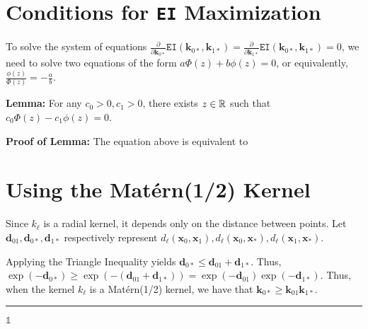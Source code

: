 \documentclass[11pt]{article}
\def\EI{\texttt{EI}}
\newcommand{\bs}[1]{\boldsymbol{#1}}
\def\bsx{\bs{x}}
\def\bsk{\bs{k}}
\def\bsd{\bs{d}}
\def\bell{\bs{\ell}}
\def\xast{\bsx_{*}}
\def\Matern{\textrm{Mat\'{e}rn}}
\begin{document}
\newpage 

\section{Conditions for \EI{} Maximization}

To solve the system of equations $\frac{\partial}{\partial \bsk_{0*}}\EI(\bsk_{0*}, \bsk_{1*}) = \frac{\partial}{\partial \bsk_{1*}}\EI(\bsk_{0*}, \bsk_{1*}) = 0$, we need to solve two equations of the form $a\Phi(z) + b\phi(z) = 0$, or equivalently, $\frac{\phi(z)}{\Phi(z)} = -\frac{a}{b}$.

\textbf{Lemma:} For any $c_0 > 0, c_1 > 0$, there exists $z \in \mathbb{R}$ such that $c_{0}\Phi(z) - c_{1}\phi(z) = 0$. 

\textbf{Proof of Lemma:} The equation above is equivalent to 

\newpage 

\section{Using the \Matern(1/2) Kernel}

Since $k_{\bell}$ is a radial kernel, it depends only on the distance between points. Let $\bsd_{01}, \bsd_{0*}, \bsd_{1*}$ respectively represent $d_{\bell}(\bsx_{0}, \bsx_{1}), d_{\bell}(\bsx_{0}, \xast), d_{\bell}(\bsx_{1}, \xast)$. 

Applying the Triangle Inequality yields $\bsd_{0*} \le \bsd_{01} + \bsd_{1*}$. Thus, $\exp(-\bsd_{0*}) \ge \exp\left(-\left(\bsd_{01} + \bsd_{1*}\right)\right) = \exp(-\bsd_{01})\exp(-\bsd_{1*})$. Thus, when the kernel $k_{\bell}$ is a \Matern(1/2) kernel, we have that $\bsk_{0*} \ge \bsk_{01}\bsk_{1*}$.
\noindent\rule{\textwidth}{0.8pt}

\newpage


$\mathbb{1}$
\end{document}
